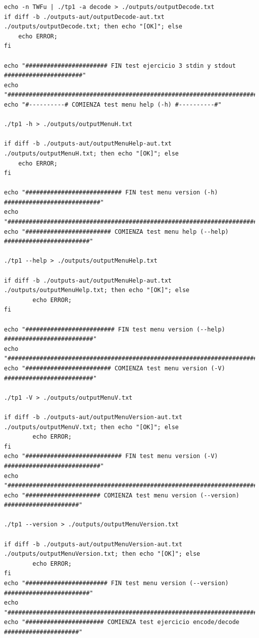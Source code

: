 \documentclass[11pt,a4paper]{article}
\begin{document}
\begin{lstlisting}
echo -n TWFu | ./tp1 -a decode > ./outputs/outputDecode.txt
if diff -b ./outputs-aut/outputDecode-aut.txt ./outputs/outputDecode.txt; then echo "[OK]"; else
	echo ERROR;
fi

echo "####################### FIN test ejercicio 3 stdin y stdout ######################"
echo "##################################################################################"
echo "#----------# COMIENZA test menu help (-h) #----------#"

./tp1 -h > ./outputs/outputMenuH.txt

if diff -b ./outputs-aut/outputMenuHelp-aut.txt ./outputs/outputMenuH.txt; then echo "[OK]"; else
	echo ERROR;
fi

echo "########################### FIN test menu version (-h) ###########################"
echo "##################################################################################"
echo "######################## COMIENZA test menu help (--help) ########################"

./tp1 --help > ./outputs/outputMenuHelp.txt

if diff -b ./outputs-aut/outputMenuHelp-aut.txt ./outputs/outputMenuHelp.txt; then echo "[OK]"; else
		echo ERROR;
fi

echo "######################### FIN test menu version (--help) #########################"
echo "##################################################################################"
echo "######################## COMIENZA test menu version (-V) #########################"

./tp1 -V > ./outputs/outputMenuV.txt

if diff -b ./outputs-aut/outputMenuVersion-aut.txt ./outputs/outputMenuV.txt; then echo "[OK]"; else
		echo ERROR;
fi
echo "########################### FIN test menu version (-V) ###########################"
echo "##################################################################################"
echo "##################### COMIENZA test menu version (--version) #####################"

./tp1 --version > ./outputs/outputMenuVersion.txt

if diff -b ./outputs-aut/outputMenuVersion-aut.txt ./outputs/outputMenuVersion.txt; then echo "[OK]"; else
		echo ERROR;
fi
echo "####################### FIN test menu version (--version) ########################"
echo "##################################################################################"
echo "###################### COMIENZA test ejercicio encode/decode #####################"


\end{lstlisting}
\end{document}
